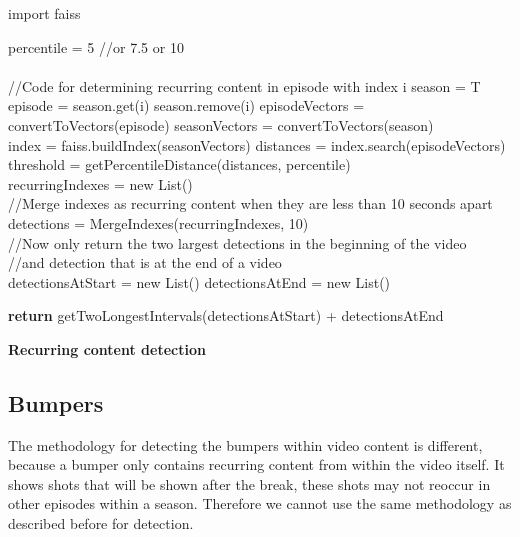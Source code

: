 \documentclass{report}
\begin{document}
\begin{algorithm}[H] 
	\SetAlgoLined
	
	import faiss
	
	percentile = 5 //or 7.5 or 10
	\texttt{\\}
	\texttt{\\}
	//Code for determining recurring content in episode with index i
	season = T\;
	episode = season.get(i)\;
	season.remove(i)\;
	episodeVectors = convertToVectors(episode)\;
	seasonVectors = convertToVectors(season)\;
	\texttt{\\}
	index = faiss.buildIndex(seasonVectors)\;
	distances = index.search(episodeVectors)\;
	\texttt{\\}
	threshold = getPercentileDistance(distances, percentile)\;
	\texttt{\\}
	recurringIndexes = new List()\;
	\texttt{\\}
	//Merge indexes as recurring content when they are less than 10 seconds apart \\
	detections = MergeIndexes(recurringIndexes, 10)\;
	\texttt{\\}
	//Now only return the two largest detections in the beginning of the video \\
	//and detection that is at the end of a video \\
	detectionsAtStart = new List()\;
	detectionsAtEnd = new List()\;

	\textbf{return} getTwoLongestIntervals(detectionsAtStart) + detectionsAtEnd

	\caption{\textbf{Recurring content detection}}
	\label{algorithm:shotboundary}
\end{algorithm}

\subsection{Bumpers}
The methodology for detecting the bumpers within video content is different, because a bumper only contains recurring content from within the video itself. It shows shots that will be shown after the break, these shots may not reoccur in other episodes within a season. Therefore we cannot use the same methodology as described before for detection.
\end{document}
